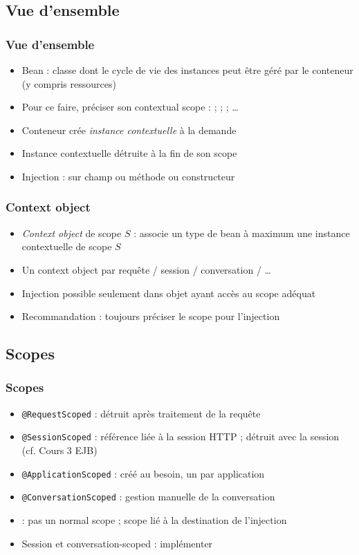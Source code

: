 \documentclass[english, french]{beamer}
\begin{document}
\subsection{Vue d’ensemble}
\begin{frame}
	\frametitle{Vue d’ensemble}
	\begin{itemize}
		\item Bean : classe dont le cycle de vie des instances peut être géré par le conteneur (y compris ressources)
		\item Pour ce faire, préciser son \og{}contextual scope\fg{} :  ;  ;  ; …
		\item Conteneur crée \emph{instance contextuelle} à la demande
		\item Instance contextuelle détruite à la fin de son scope
		\item Injection :  sur champ {\tiny ou méthode ou constructeur}
	\end{itemize}
\end{frame}

\begin{frame}
	\frametitle{Context object}
	\begin{itemize}
		\item \emph{Context object} de scope $S$ : associe un type de bean à maximum une instance contextuelle de scope $S$
		\item Un context object par requête / session / conversation / …
		\item Injection possible seulement dans objet ayant accès au scope adéquat
		\item Recommandation : toujours préciser le scope pour l’injection
	\end{itemize}
\end{frame}

\subsection{Scopes}
\begin{frame}
	\frametitle{Scopes}
	\begin{itemize}
		\item \texttt{@RequestScoped} : détruit après traitement de la requête
		\item \texttt{@SessionScoped} : référence liée à la session HTTP ; détruit avec la session (cf. Cours 3 EJB)
		\item \texttt{@ApplicationScoped} : créé au besoin, un par application
		\item \texttt{@ConversationScoped} : gestion manuelle de la conversation
		\item {} : pas un normal scope ; scope lié à la destination de l’injection
		\item Session et conversation-scoped : implémenter 
	\end{itemize}
\end{frame}
\end{document}
